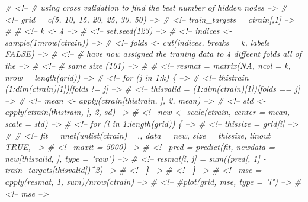 \documentclass[]{article}
\newenvironment{Shaded}{\begin{snugshade}}{\end{snugshade}}
\newcommand{\CommentTok}[1]{\textcolor[rgb]{0.56,0.35,0.01}{\textit{#1}}}
\begin{document}
\begin{Shaded}
\begin{Highlighting}[]
\CommentTok{# <!-- # using cross validation to find the best number of hidden nodes -->}
\CommentTok{# <!-- grid = c(5, 10, 15, 20, 25, 30, 50) -->}
\CommentTok{# <!-- train_targets = ctrain[,1] -->}
\CommentTok{# }
\CommentTok{# <!-- k <- 4 -->}
\CommentTok{# <!-- set.seed(123) -->}
\CommentTok{# <!-- indices <- sample(1:nrow(ctrain)) -->}
\CommentTok{# <!-- folds <- cut(indices, breaks = k, labels = FALSE) -->}
\CommentTok{# <!-- # have now assigned the traning data to 4 diffeent folds all of the -->}
\CommentTok{# <!-- # same size (101) -->}
\CommentTok{# }
\CommentTok{# <!-- resmat = matrix(NA, ncol = k, nrow = length(grid)) -->}
\CommentTok{# <!-- for (j in 1:k) \{ -->}
\CommentTok{# <!--     thistrain = (1:dim(ctrain)[1])[folds != j] -->}
\CommentTok{# <!--     thisvalid = (1:dim(ctrain)[1])[folds == j] -->}
\CommentTok{# <!--     mean <- apply(ctrain[thistrain, ], 2, mean) -->}
\CommentTok{# <!--     std <- apply(ctrain[thistrain, ], 2, sd) -->}
\CommentTok{# <!--     new <- scale(ctrain, center = mean, scale = std) -->}
\CommentTok{# <!--     for (i in 1:length(grid)) \{ -->}
\CommentTok{# <!--         thissize = grid[i] -->}
\CommentTok{# }
\CommentTok{# <!--         fit = nnet(unlist(ctrain) ~ ., data = new, size = thissize, linout = TRUE, -->}
\CommentTok{# <!--             maxit = 5000) -->}
\CommentTok{# <!--         pred = predict(fit, newdata = new[thisvalid, ], type = "raw") -->}
\CommentTok{# <!--         resmat[i, j] = sum((pred[, 1] - train_targets[thisvalid])^2) -->}
\CommentTok{# <!--     \} -->}
\CommentTok{# <!-- \} -->}
\CommentTok{# <!-- mse = apply(resmat, 1, sum)/nrow(ctrain) -->}
\CommentTok{# <!-- #plot(grid, mse, type = "l") -->}
\CommentTok{# <!-- mse -->}
\end{Highlighting}
\end{Shaded}
\end{document}
